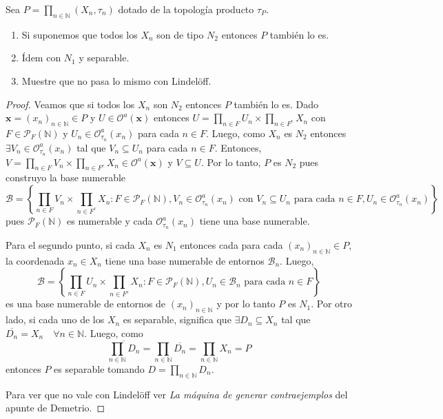 \documentclass{article}
\theoremstyle{plain}
\theoremstyle{definition}
\newcommand{\N}{\mathbb{N}}
\newcommand{\cl}[1]{\overline{#1}}              %
\newcommand{\pf}{\mathcal{P}_F}                 %
\newenvironment{ejercicio}[1]{\begin{trivlist}
\item[\hskip \labelsep {\bfseries Ejercicio}\hskip \labelsep {\bfseries #1.}]}{\end{trivlist}}
\begin{document}
\begin{ejercicio}{2}
    Sea \( P = \prod_{n \in \N} (X_n, \tau_n) \) dotado de la topología producto \( \tau_P \).
    \begin{enumerate}
        \item Si suponemos que todos los \( X_n \) son de tipo \( N_2 \) entonces \( P \) también lo es.
        \item Ídem con \( N_1 \) y separable.
        \item Muestre que no pasa lo mismo con Lindelöff.
    \end{enumerate}
\end{ejercicio}
\begin{proof}
    Veamos que si todos los \( X_n \) son \( N_2 \) entonces \( P \) también lo es. Dado \( \mathbf{x} = {(x_n)}_{n \in \N} \in P \) y \( U \in \mathcal{O}^a(\mathbf{x}) \) entonces \( U = \prod_{n \in F} U_n \times \prod_{n \in F^c} X_n \) con \( F \in \pf{(\N)} \) y \( U_n \in \mathcal{O}^a_{\tau_n}(x_n) \) para cada \( n \in F \).
    Luego, como \( X_n \) es \( N_2 \) entonces \( \exists V_n \in \mathcal{O}^a_{\tau_n}(x_n) \) tal que \( V_n \subseteq U_n \) para cada \( n \in F \). Entonces, \( V = \prod_{n \in F} V_n \times \prod_{n \in F^c} X_n \in \mathcal{O}^a(\mathbf{x}) \) y \( V \subseteq U \).
    Por lo tanto, \( P \) es \( N_2 \) pues construyo la base numerable \[
        \mathcal{B} = \left \{ \prod_{n \in F} V_n \times \prod_{n \in F^c} X_n : F \in \pf{(\N)}, V_n \in \mathcal{O}^a_{\tau_n}(x_n) \text{ con } V_n \subseteq U_n \text{ para cada } n \in F, U_n \in \mathcal{O}^a_{\tau_n}(x_n) \right \}
    \]
    pues \( \pf{(\N)} \) es numerable y cada \( \mathcal{O}^a_{\tau_n}(x_n) \) tiene una base numerable.

    Para el segundo punto, si cada \( X_n \) es \( N_1 \) entonces cada para cada \( {(x_n)}_{n \in \N} \in P \), la coordenada \( x_n \in X_n \) tiene una base numerable de entornos \( \mathcal{B}_n \).
    Luego, \[
        \mathcal{B} = \left \{ \prod_{n \in F} U_n \times \prod_{n \in F^c} X_n : F \in \pf{(\N)}, U_n \in \mathcal{B}_n \text{ para cada } n \in F \right \}
    \] es una base numerable de entornos de \( {(x_n)}_{n \in \N} \) y por lo tanto \( P \) es \( N_1 \). Por otro lado, si cada uno de los \( X_n \) es separable, significa que \( \exists D_n \subseteq X_n \)
    tal que \( \cl{D_n} = X_n \quad \forall n \in \N \). Luego, como \[
        \cl{\prod_{n \in \N} D_n} = \prod_{n \in \N} \cl{D_n} = \prod_{n \in \N} X_n = P
    \] entonces \( P \) es separable tomando \( D = \prod_{n \in \N} D_n \).

    Para ver que no vale con Lindelöff ver \emph{La máquina de generar contraejemplos} del apunte de Demetrio.
\end{proof}
\end{document}
